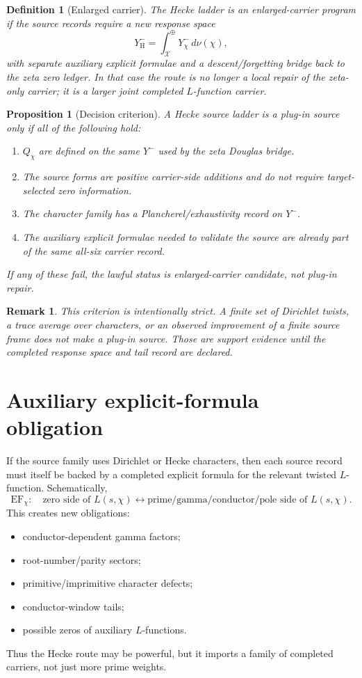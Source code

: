 \documentclass[11pt]{article}
\newtheorem{proposition}[theorem]{Proposition}
\newtheorem{definition}[theorem]{Definition}
\newtheorem{remark}[theorem]{Remark}
\begin{document}
\begin{definition}[Enlarged carrier]
The Hecke ladder is an enlarged-carrier program if the source records require a new response space
\[
  Y^-_{\mathrm H}=\int_{\mathcal X}^{\oplus}Y^-_\chi\,d\nu(\chi),
\]
with separate auxiliary explicit formulae and a descent/forgetting bridge back to the zeta zero ledger. In that case the route is no longer a local repair of the zeta-only carrier; it is a larger joint completed $L$-function carrier.
\end{definition}

\begin{proposition}[Decision criterion]
A Hecke source ladder is a plug-in source only if all of the following hold:
\begin{enumerate}[label=(\roman*)]
\item $Q_\chi$ are defined on the same $Y^-$ used by the zeta Douglas bridge.
\item The source forms are positive carrier-side additions and do not require target-selected zero information.
\item The character family has a Plancherel/exhaustivity record on $Y^-$.
\item The auxiliary explicit formulae needed to validate the source are already part of the same all-six carrier record.
\end{enumerate}
If any of these fail, the lawful status is enlarged-carrier candidate, not plug-in repair.
\end{proposition}

\begin{remark}
This criterion is intentionally strict. A finite set of Dirichlet twists, a trace average over characters, or an observed improvement of a finite source frame does not make a plug-in source. Those are support evidence until the completed response space and tail record are declared.
\end{remark}

\section{Auxiliary explicit-formula obligation}
If the source family uses Dirichlet or Hecke characters, then each source record must itself be backed by a completed explicit formula for the relevant twisted $L$-function. Schematically,
\[
  \mathrm{EF}_\chi:
  \quad \text{zero side of }L(s,\chi)
  \leftrightarrow
  \text{prime/gamma/conductor/pole side of }L(s,\chi).
\]
This creates new obligations:
\begin{itemize}
\item conductor-dependent gamma factors;
\item root-number/parity sectors;
\item primitive/imprimitive character defects;
\item conductor-window tails;
\item possible zeros of auxiliary $L$-functions.
\end{itemize}
Thus the Hecke route may be powerful, but it imports a family of completed carriers, not just more prime weights.
\end{document}
